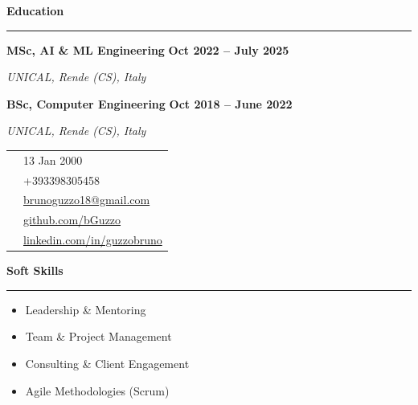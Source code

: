 \documentclass[9pt, a4paper]{article}
\newcommand{\cvsection}[1]{%
	\vspace{2pt}\par
	{\Large\bfseries\color{sectionblue}#1}\par
	\vspace{2pt}\hrule\vspace{6pt}
}
\newcommand{\cvsubsection}[3]{%
	\par {\large\bfseries #1} \hfill {\bfseries #2} \par {\textit{#3}} \vspace{4pt}
}
\begin{document}
\begin{minipage}[t]{0.65\linewidth}
		\vspace{10pt}\par
		\cvsection{Education}
		
		\cvsubsection{MSc, AI \& ML Engineering}{Oct 2022 -- July 2025}{UNICAL, Rende (CS), Italy}
		\cvsubsection{BSc, Computer Engineering}{Oct 2018 -- June 2022}{UNICAL, Rende (CS), Italy}
		
	\end{minipage}%
	\hfill%
	\begin{minipage}[t]{0.32\linewidth}
		\vspace{0pt} %
		
		\begin{center}
		\end{center}
		
		\begin{tabularx}{\linewidth}{@{}lX@{}}
			\faBirthdayCake & 13 Jan 2000 \\
			\faPhone & +393398305458 \\
			\faEnvelope & \href{mailto:brunoguzzo18@gmail.com}{brunoguzzo18@gmail.com} \\
			\faGithub & \href{https://github.com/bGuzzo}{github.com/bGuzzo} \\
			\faLinkedin & \href{https://www.linkedin.com/in/guzzobruno/}{linkedin.com/in/guzzobruno} \\
		\end{tabularx}
		\vspace{4pt}
		
		\cvsection{Soft Skills}
		\begin{itemize}[leftmargin=*, nosep, itemsep=2pt]
			\footnotesize
			\item Leadership \& Mentoring
			\item Team \& Project Management
			\item Consulting \& Client Engagement
			\item Agile Methodologies (Scrum)
		\end{itemize}
		\vspace{5pt}
		

\end{minipage}
\end{document}
